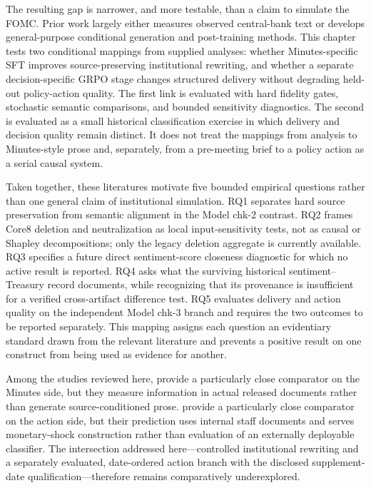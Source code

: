 The resulting gap is narrower, and more testable, than a claim to simulate the
FOMC. Prior work largely either measures observed central-bank text or develops
general-purpose conditional generation and post-training methods. This chapter
tests two conditional mappings from supplied analyses: whether
Minutes-specific SFT improves source-preserving institutional rewriting, and
whether a separate decision-specific GRPO stage changes structured delivery
without degrading held-out policy-action quality. The first link is evaluated
with hard fidelity gates, stochastic semantic comparisons, and bounded
sensitivity diagnostics. The second is evaluated as a small historical
classification exercise in which delivery and decision quality remain
distinct. It does not treat the mappings from analysis to Minutes-style prose
and, separately, from a pre-meeting brief to a policy action as a serial causal
system.

Taken together, these literatures motivate five bounded empirical questions
rather than one general claim of institutional simulation. RQ1 separates hard
source preservation from semantic alignment in the Model chk-2 contrast. RQ2
frames Core8 deletion and neutralization as local input-sensitivity tests, not
as causal or Shapley decompositions; only the legacy deletion aggregate is
currently available. RQ3 specifies a future direct sentiment-score closeness
diagnostic for which no active result is reported. RQ4 asks what the surviving
historical sentiment--Treasury record documents, while recognizing that its
provenance is insufficient for a verified cross-artifact difference test. RQ5
evaluates delivery and action quality on the independent Model chk-3 branch
and requires the two outcomes to be reported separately. This mapping assigns
each question an evidentiary standard drawn from the relevant literature and
prevents a positive result on one construct from being used as evidence for
another.

Among the studies reviewed here, \citet{chen2026decoding} provide a
particularly close comparator on the Minutes side, but they measure
information in actual released documents rather than generate
source-conditioned prose. \citet{aruoba2024identifying} provide a particularly
close comparator on the action side, but their prediction uses internal staff
documents and serves monetary-shock construction rather than evaluation of an
externally deployable classifier. The intersection addressed
here---controlled institutional rewriting and a separately evaluated,
date-ordered action branch with the disclosed supplement-date
qualification---therefore remains comparatively underexplored.
